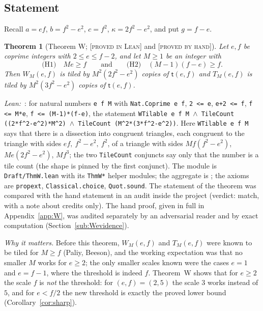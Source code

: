 \documentclass[11pt,reqno]{amsart}
\theoremstyle{plain}
\newtheorem{theorem}{Theorem}[section]
\theoremstyle{definition}
\newcommand{\lab}[1]{\textup{[\textsc{#1}]}}
\newcommand{\PL}{\lab{proved in Lean}}
\newcommand{\PH}{\lab{proved by hand}}
\newcommand{\why}[1]{\par\smallskip\noindent\emph{Why it matters.} #1\par}
\newcommand{\tile}{\mathsf{t}}
\begin{document}
\subsection{Statement}
Recall $a=ef$, $b=f^2-e^2$, $c=f^2$, $\kappa=2f^2-e^2$, and put $g=f-e$.
\begin{theorem}[Theorem W; \PL{} and \PH{}]\label{thm:W}
Let $e,f$ be coprime integers with $2\le e\le f-2$, and let $M\ge1$ be an integer with
\[
\text{(H1)}\quad Me\ge f\qquad\text{and}\qquad \text{(H2)}\quad (M-1)(f-e)\ge f .
\]
Then $W_M(e,f)$ is tiled by $M^2(2f^2-e^2)$ copies of $\tile(e,f)$ and $T_M(e,f)$ is tiled by $M^2(3f^2-e^2)$ copies of $\tile(e,f)$.
\end{theorem}
\emph{Lean:} \,: for natural numbers \texttt{e f M} with \texttt{Nat.Coprime e f}, \texttt{2 <= e}, \texttt{e+2 <= f}, \texttt{f <= M*e}, \texttt{f <= (M-1)*(f-e)}, the statement \texttt{WTilable e f M $\wedge$ TileCount ((2*f\^{}2-e\^{}2)*M\^{}2) $\wedge$ TileCount (M\^{}2*(3*f\^{}2-e\^{}2))}.
Here \texttt{WTilable e f M} says that there is a dissection into congruent triangles, each congruent to the triangle with sides $ef,\ f^2-e^2,\ f^2$, of a triangle with sides $Mf(f^2-e^2)$, $Me(2f^2-e^2)$, $Mf^3$; the two \texttt{TileCount} conjuncts say only that the number is a tile count (the shape is pinned by the first conjunct).
The module is \texttt{Draft/ThmW.lean} with its \texttt{ThmW*} helper modules; the aggregate is ; the axioms are \texttt{propext}, \texttt{Classical.choice}, \texttt{Quot.sound}.
The statement of the theorem was compared with the hand statement in an audit inside the project (verdict: match, with a note about credits only).
The hand proof, given in full in Appendix~\ref{app:W}, was audited separately by an adversarial reader and by exact computation (Section~\ref{sub:Wevidence}).

\why{Before this theorem, $W_M(e,f)$ and $T_M(e,f)$ were known to be tiled for $M\ge f$ (Paliy, Beeson), and the working expectation was that no smaller $M$ works for $e\ge2$; the only smaller scales known were the cases $e=1$ and $e=f-1$, where the threshold is indeed $f$.
Theorem~W shows that for $e\ge2$ the scale $f$ is \emph{not} the threshold: for $(e,f)=(2,5)$ the scale $3$ works instead of $5$, and for $e<f/2$ the new threshold is exactly the proved lower bound (Corollary~\ref{cor:sharp}).}
\end{document}
